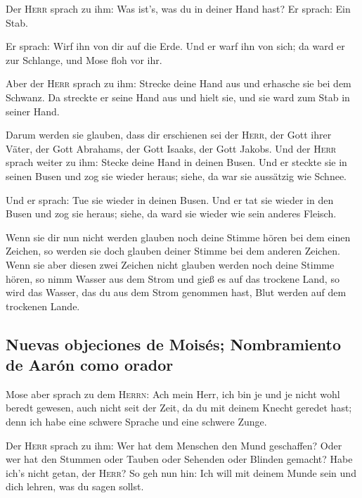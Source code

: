  Der \textsc{Herr} sprach zu ihm: Was ist's, was du in
deiner Hand hast? Er sprach: Ein Stab.

 Er sprach: Wirf ihn von dir auf die Erde. Und er warf ihn
von sich; da ward er zur Schlange, und Mose floh vor ihr.

 Aber der \textsc{Herr} sprach zu ihm: Strecke deine Hand
aus und erhasche sie bei dem Schwanz. Da streckte er seine Hand aus und
hielt sie, und sie ward zum Stab in seiner Hand.

 Darum werden sie glauben, dass dir erschienen sei der
\textsc{Herr}, der Gott ihrer Väter, der Gott Abrahams, der Gott Isaaks,
der Gott Jakobs.  Und der \textsc{Herr} sprach weiter zu
ihm: Stecke deine Hand in deinen Busen. Und er steckte sie in seinen
Busen und zog sie wieder heraus; siehe, da war sie aussätzig wie Schnee.

 Und er sprach: Tue sie wieder in deinen Busen. Und er tat
sie wieder in den Busen und zog sie heraus; siehe, da ward sie wieder
wie sein anderes Fleisch.

 Wenn sie dir nun nicht werden glauben noch deine Stimme
hören bei dem einen Zeichen, so werden sie doch glauben deiner Stimme
bei dem anderen Zeichen.  Wenn sie aber diesen zwei
Zeichen nicht glauben werden noch deine Stimme hören, so nimm Wasser aus
dem Strom und gieß es auf das trockene Land, so wird das Wasser, das du
aus dem Strom genommen hast, Blut werden auf dem trockenen Lande.

\hypertarget{nuevas-objeciones-de-moisuxe9s-nombramiento-de-aaruxf3n-como-orador}{%
\subsection{Nuevas objeciones de Moisés; Nombramiento de Aarón como
orador}\label{nuevas-objeciones-de-moisuxe9s-nombramiento-de-aaruxf3n-como-orador}}

 Mose aber sprach zu dem \textsc{Herrn}: Ach mein Herr,
ich bin je und je nicht wohl beredt gewesen, auch nicht seit der Zeit,
da du mit deinem Knecht geredet hast; denn ich habe eine schwere Sprache
und eine schwere Zunge.

 Der \textsc{Herr} sprach zu ihm: Wer hat dem Menschen
den Mund geschaffen? Oder wer hat den Stummen oder Tauben oder Sehenden
oder Blinden gemacht? Habe ich's nicht getan, der \textsc{Herr}?
 So geh nun hin: Ich will mit deinem Munde sein und dich
lehren, was du sagen sollst.

